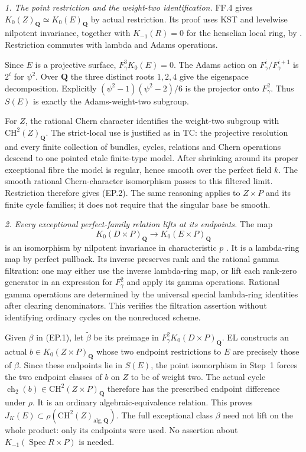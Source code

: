 \emph{1. The point restriction and the weight-two identification.}
FF.4 gives
$K_0(Z)_{\mathbf Q}\simeq K_0(E)_{\mathbf Q}$ by actual restriction.
Its proof uses KST and levelwise nilpotent invariance, together with
$K_{-1}(R)=0$ for the henselian local ring, by
\citet[Theorem 3.7 and Remark (ii), p.~8]{frDrinfeld2004Tate}.
Restriction commutes with lambda and Adams operations.

Since $E$ is a projective surface, $F_\gamma^3K_0(E)=0$.
The Adams action on $F_\gamma^i/F_\gamma^{i+1}$ is $2^i$ for
$\psi^2$\citep[Chapter II, Proposition 4.9 and Remark 8.8.5]
{D_Weibel2013KbookII}.  Over $\mathbf Q$ the three distinct roots
$1,2,4$ give the eigenspace decomposition.  Explicitly
$(\psi^2-1)(\psi^2-2)/6$ is the projector onto $F_\gamma^2$.
Thus $S(E)$ is exactly the Adams-weight-two subgroup.

For $Z$, the rational Chern character identifies the weight-two
subgroup with $\mathrm{CH}^2(Z)_{\mathbf Q}$.  The strict-local
use is justified as in TC: the projective resolution and every
finite collection of bundles, cycles, relations and Chern
operations descend to one pointed etale finite-type model.
After shrinking around its proper exceptional fibre the model
is regular, hence smooth over the perfect field $k$.
The smooth rational Chern-character isomorphism
\citep[Chapter II, Corollary 8.9.1, p.~84]{D_Weibel2013KbookII}
passes to this filtered limit.  Restriction therefore gives (EP.2).
The same reasoning applies to $Z\times P$ and its finite cycle
families; it does not require that the singular base be smooth.

\emph{2. Every exceptional perfect-family relation lifts at its endpoints.}
The map
\[
       K_0(D\times P)_{\mathbf Q}
             \longrightarrow K_0(E\times P)_{\mathbf Q}
\]
is an isomorphism by nilpotent invariance in characteristic $p$
\citep[Theorem A]{rootGeisserHesselholt2011}.  It is a lambda-ring
map by perfect pullback.  Its inverse preserves rank and the
rational gamma filtration: one may either use the inverse
lambda-ring map, or lift each rank-zero generator in an expression
for $F_\gamma^2$ and apply its gamma operations.  Rational gamma
operations are determined by the universal special lambda-ring
identities after clearing denominators.  This verifies the
filtration assertion without identifying ordinary cycles on the
nonreduced scheme.

Given $\beta$ in (EP.1), let $\widetilde\beta$ be its preimage in
$F_\gamma^2K_0(D\times P)_{\mathbf Q}$.  EL constructs an actual
$b\in K_0(Z\times P)_{\mathbf Q}$ whose two endpoint restrictions
to $E$ are precisely those of $\beta$.  Since these endpoints lie
in $S(E)$, the point isomorphism in Step~1 forces the two endpoint
classes of $b$ on $Z$ to be of weight two.  The actual cycle
$\operatorname{ch}_2(b)\in\mathrm{CH}^2(Z\times P)_{\mathbf Q}$
therefore has the prescribed endpoint difference under $\rho$.
It is an ordinary algebraic-equivalence relation.  This proves
$J_K(E)\subset\rho(\mathrm{CH}^2(Z)_{\mathrm{alg},\mathbf Q})$.
The full exceptional class $\beta$ need not lift on the whole
product: only its endpoints were used.  No assertion about
$K_{-1}(\operatorname{Spec}R\times P)$ is needed.

